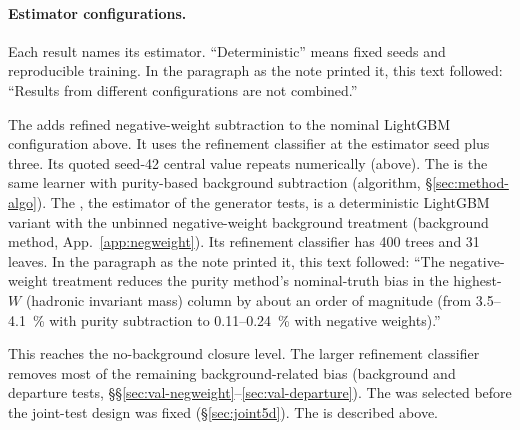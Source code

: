 \paragraph{Estimator configurations.} Each result names its estimator. ``Deterministic'' means fixed seeds and reproducible training. In the paragraph as the note printed it, this text followed: ``Results from different configurations are not combined.''\par The \estTwoD{} adds refined negative-weight subtraction to the nominal LightGBM configuration above. It uses the \estMultiD{} refinement classifier at the estimator seed plus three. Its quoted seed-42 central value repeats numerically (above). The \estPurity{} is the same learner with purity-based background subtraction (algorithm, \S\ref{sec:method-algo}). The \estMultiD{}, the estimator of the generator tests, is a deterministic LightGBM variant with the unbinned negative-weight background treatment (background method, App.~\ref{app:negweight}). Its refinement classifier has 400 trees and 31 leaves. In the paragraph as the note printed it, this text followed: ``The negative-weight treatment reduces the purity method's nominal-truth bias in the highest-$W$ (hadronic invariant mass) column by about an order of magnitude (from 3.5--\SI{4.1}{\percent} with purity subtraction to 0.11--\SI{0.24}{\percent} with negative weights).''\par This reaches the no-background closure level. The larger refinement classifier removes most of the remaining background-related bias (background and departure tests, \S\S\ref{sec:val-negweight}--\ref{sec:val-departure}). The \estMultiD{} was selected before the joint-test design was fixed (\S\ref{sec:joint5d}). The \estExact{} is described above.
